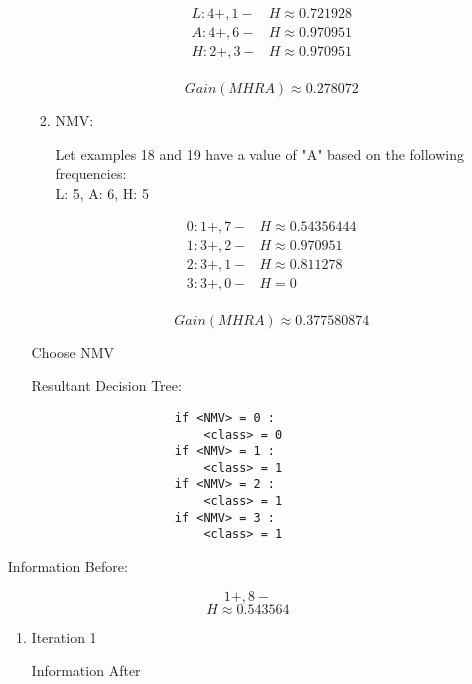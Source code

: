\begin{enumerate}
\begin{enumerate}
\begin{enumerate}
						\[
							\begin{array}{l|l}
								L: 4+, 1- & H \approx 0.721928 \\
								A: 4+, 6- & H \approx 0.970951 \\
								H: 2+, 3- & H \approx 0.970951 \\
							\end{array}
						\] 
						
						\[
							Gain(MHRA) \approx 0.278072
						\]

					\item{NMV:}
					
						Let examples 18 and 19 have a value of "A" based on the following frequencies: \\
						L: 5, A: 6, H: 5

						\[
							\begin{array}{l|l}
								0: 1+, 7- & H \approx 0.54356444 \\
								1: 3+, 2- & H \approx 0.970951 \\
								2: 3+, 1- & H \approx 0.811278 \\
								3: 3+, 0- & H = 0 \\
							\end{array}
						\] 
						
						\[
							Gain(MHRA) \approx 0.377580874
						\]
				
				\end{enumerate}
			
				Choose NMV
				
				Resultant Decision Tree:
				
				\begin{lstlisting}
					if <NMV> = 0 :
						<class> = 0
					if <NMV> = 1 :
						<class> = 1
					if <NMV> = 2 :
						<class> = 1
					if <NMV> = 3 :
						<class> = 1
				\end{lstlisting}
						
		\end{enumerate}
		
		Information Before:
		
		\[
			1+, 8- 
		\]
		\[
			H \approx 0.543564
		\]
		
		\begin{enumerate}
		
			\item{Iteration 1}
			
				Information After
				
				\begin{enumerate}
				

\end{enumerate}
\end{enumerate}
\end{enumerate}
